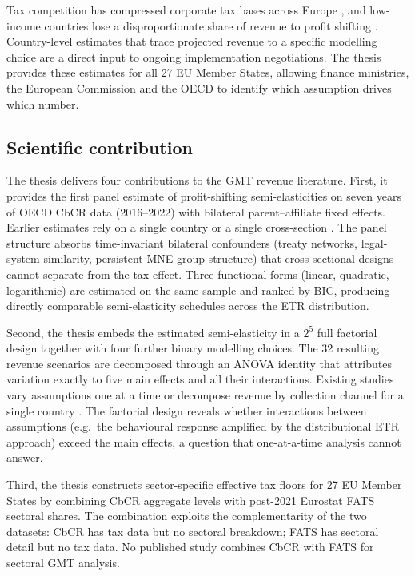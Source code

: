 \documentclass[11pt,a4paper]{article}
\begin{document}
Tax competition has compressed corporate tax bases across Europe \citep{cassee2019}, and low-income countries lose a disproportionate share of revenue to profit shifting \citep{cobham2018,garcia-bernardo2024}. Country-level estimates that trace projected revenue to a specific modelling choice are a direct input to ongoing implementation negotiations. The thesis provides these estimates for all 27 EU Member States, allowing finance ministries, the European Commission and the OECD to identify which assumption drives which number.

\subsection{Scientific contribution}\label{sec:contribution}

The thesis delivers four contributions to the GMT revenue literature. First, it provides the first panel estimate of profit-shifting semi-elasticities on seven years of OECD CbCR data (2016--2022) with bilateral parent--affiliate fixed effects. Earlier estimates rely on a single country \citep{dowd2017,boukal2026} or a single cross-section \citep{garcia-bernardo2024}. The panel structure absorbs time-invariant bilateral confounders (treaty networks, legal-system similarity, persistent MNE group structure) that cross-sectional designs cannot separate from the tax effect. Three functional forms (linear, quadratic, logarithmic) are estimated on the same sample and ranked by BIC, producing directly comparable semi-elasticity schedules across the ETR distribution.

Second, the thesis embeds the estimated semi-elasticity in a $2^5$ full factorial design together with four further binary modelling choices. The 32 resulting revenue scenarios are decomposed through an ANOVA identity that attributes variation exactly to five main effects and all their interactions. Existing studies vary assumptions one at a time \citep{barake2022,hugger2026} or decompose revenue by collection channel for a single country \citep{boukal2026}. The factorial design reveals whether interactions between assumptions (e.g.\ the behavioural response amplified by the distributional ETR approach) exceed the main effects, a question that one-at-a-time analysis cannot answer.

Third, the thesis constructs sector-specific effective tax floors for 27 EU Member States by combining CbCR aggregate levels with post-2021 Eurostat FATS sectoral shares. The combination exploits the complementarity of the two datasets: CbCR has tax data but no sectoral breakdown; FATS has sectoral detail but no tax data. No published study combines CbCR with FATS for sectoral GMT analysis.
\end{document}
